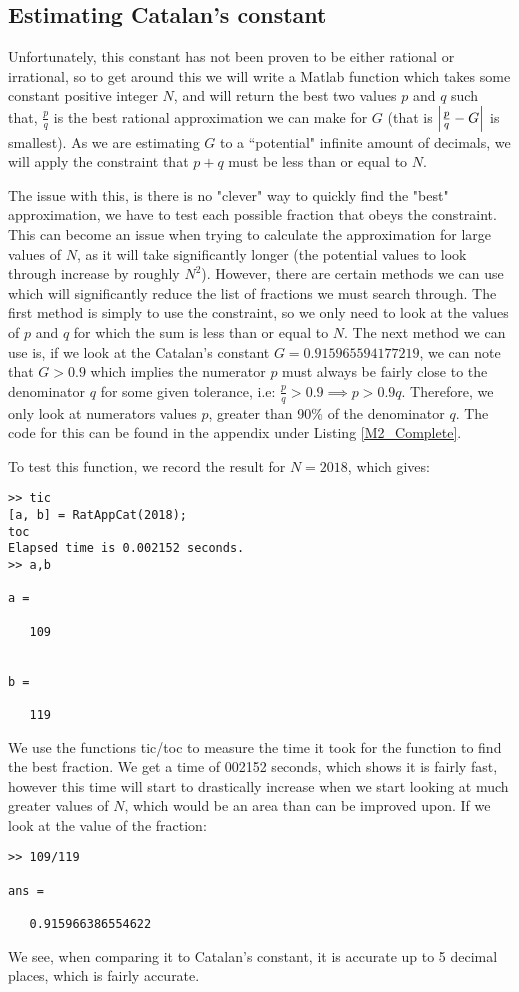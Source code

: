 \documentclass[12pt]{article}
\begin{document}
\subsection{Estimating Catalan’s constant}
Unfortunately, this constant has not been proven to be either rational or irrational, so to get around this we will write a Matlab function which takes some constant positive integer  $N$, and will return the best two values $p$ and $q$ such that, $\frac{p}{q}$ is the best rational approximation we can make for $G$ (that is $\abs{\frac{p}{q}-G}$ is smallest). As we are estimating $G$ to a ``potential" infinite amount of decimals, we will apply the constraint that $p+q$ must be less than or equal to $N$.

The issue with this, is there is no "clever" way to quickly find the "best" approximation, we have to test each possible fraction that obeys the constraint. This can become an issue when trying to calculate the approximation for large values of $N$, as it will take significantly longer (the potential values to look through increase by roughly $N^2$). However, there are certain methods we can use which will significantly reduce the list of fractions we must search through. The first method is simply to use the constraint, so we only need to look at the values of $p$ and $q$ for which the sum is less than or equal to $N$. The next method we can use is, if we look at the Catalan's constant $G=0.915965594177219$, we can note that $G > 0.9$ which implies the numerator $p$ must always be fairly close to the denominator $q$ for some given tolerance, i.e: $\frac{p}{q} > 0.9 \implies p > 0.9q$. Therefore, we only look at numerators values $p$, greater than 90\% of the denominator $q$. The code for this can be found in the appendix under Listing \ref{M2_Complete}.

To test this function, we record the result for $N=2018$, which gives:
\begin{lstlisting}[title={Result for Catalans constant}]
>> tic
[a, b] = RatAppCat(2018);
toc
Elapsed time is 0.002152 seconds.
>> a,b

a =

   109


b =

   119
\end{lstlisting}
We use the functions tic/toc to measure the time it took for the function to find the best fraction. We get a time of 002152 seconds, which shows it is fairly fast, however this time will start to drastically increase when we start looking at much greater values of $N$, which would be an area than can be improved upon. If we look at the value of the fraction:
\begin{lstlisting}[title={Value of result}]
>> 109/119

ans =

   0.915966386554622
\end{lstlisting}
We see, when comparing it to Catalan's constant, it is accurate up to 5 decimal places, which is fairly accurate.
\end{document}
